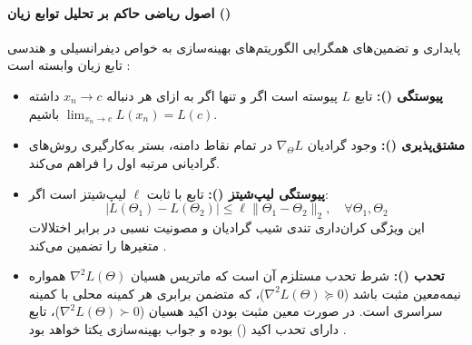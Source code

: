 \paragraph*{اصول ریاضی حاکم بر تحلیل توابع زیان ()}
پایداری و تضمین‌های همگرایی الگوریتم‌های بهینه‌سازی به خواص دیفرانسیلی و هندسی تابع زیان وابسته است \cite{ciampiconi2024survey}:
\begin{itemize}
    \item \textbf{پیوستگی ():} تابع $L$ پیوسته است اگر و تنها اگر به ازای هر دنباله $x_n \to c$ داشته باشیم $\lim_{x_n \to c} L(x_n) = L(c)$.
    \item \textbf{مشتق‌پذیری ():} وجود گرادیان $\nabla_\Theta L$ در تمام نقاط دامنه، بستر به‌کارگیری روش‌های گرادیانی مرتبه اول را فراهم می‌کند.
    \item \textbf{پیوستگی لیپ‌شیتز ():} تابع با ثابت $\ell$ لیپ‌شیتز است اگر:
    \begin{equation}
        |L(\Theta_1) - L(\Theta_2)| \le \ell \|\Theta_1 - \Theta_2\|_2, \quad \forall \Theta_1, \Theta_2
    \end{equation}
    این ویژگی کران‌داری تندی شیب گرادیان و مصونیت نسبی در برابر اختلالات متغیرها را تضمین می‌کند \cite{chen2026unveiling}.
    \item \textbf{تحدب ():} شرط تحدب مستلزم آن است که ماتریس هسیان $\nabla^2 L(\Theta)$ همواره نیمه‌معین مثبت باشد ($\nabla^2 L(\Theta) \succeq 0$)، که متضمن برابری هر کمینه محلی با کمینه سراسری است. در صورت معین مثبت بودن اکید هسیان ($\nabla^2 L(\Theta) \succ 0$)، تابع دارای تحدب اکید () بوده و جواب بهینه‌سازی یکتا خواهد بود \cite{ciampiconi2024survey}.
\end{itemize}

